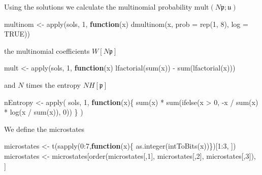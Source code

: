 \documentclass[
]{article}
\newenvironment{Shaded}{\begin{snugshade}}{\end{snugshade}}
\newcommand{\AttributeTok}[1]{\textcolor[rgb]{0.77,0.63,0.00}{#1}}
\newcommand{\ConstantTok}[1]{\textcolor[rgb]{0.00,0.00,0.00}{#1}}
\newcommand{\ControlFlowTok}[1]{\textcolor[rgb]{0.13,0.29,0.53}{\textbf{#1}}}
\newcommand{\DecValTok}[1]{\textcolor[rgb]{0.00,0.00,0.81}{#1}}
\newcommand{\FunctionTok}[1]{\textcolor[rgb]{0.00,0.00,0.00}{#1}}
\newcommand{\NormalTok}[1]{#1}
\newcommand{\OtherTok}[1]{\textcolor[rgb]{0.56,0.35,0.01}{#1}}
\newcommand{\SpecialCharTok}[1]{\textcolor[rgb]{0.00,0.00,0.00}{#1}}
\newcommand{\prob}[1]{\mathfrak{#1}}
\begin{document}
Using the solutions we calculate the multinomial probability
\(\text{mult}(N\prob p;\prob u)\)

\begin{Shaded}
\begin{Highlighting}[]
\NormalTok{multinom }\OtherTok{\textless{}{-}} \FunctionTok{apply}\NormalTok{(sols, }\DecValTok{1}\NormalTok{, }\ControlFlowTok{function}\NormalTok{(x) }\FunctionTok{dmultinom}\NormalTok{(x, }\AttributeTok{prob =} \FunctionTok{rep}\NormalTok{(}\DecValTok{1}\NormalTok{, }\DecValTok{8}\NormalTok{), }\AttributeTok{log =} \ConstantTok{TRUE}\NormalTok{))}
\end{Highlighting}
\end{Shaded}

the multinomial coefficients \(W[N\prob p]\)

\begin{Shaded}
\begin{Highlighting}[]
\NormalTok{mult }\OtherTok{\textless{}{-}} \FunctionTok{apply}\NormalTok{(sols, }\DecValTok{1}\NormalTok{, }\ControlFlowTok{function}\NormalTok{(x) }\FunctionTok{lfactorial}\NormalTok{(}\FunctionTok{sum}\NormalTok{(x)) }\SpecialCharTok{{-}} \FunctionTok{sum}\NormalTok{(}\FunctionTok{lfactorial}\NormalTok{(x)))}
\end{Highlighting}
\end{Shaded}

and \(N\) times the entropy \(N H[\prob p]\)

\begin{Shaded}
\begin{Highlighting}[]
\NormalTok{nEntropy }\OtherTok{\textless{}{-}} \FunctionTok{apply}\NormalTok{(}
\NormalTok{    sols, }\DecValTok{1}\NormalTok{,}
    \ControlFlowTok{function}\NormalTok{(x)\{}
        \FunctionTok{sum}\NormalTok{(x) }\SpecialCharTok{*} \FunctionTok{sum}\NormalTok{(}\FunctionTok{ifelse}\NormalTok{(x }\SpecialCharTok{\textgreater{}} \DecValTok{0}\NormalTok{, }\SpecialCharTok{{-}}\NormalTok{x }\SpecialCharTok{/} \FunctionTok{sum}\NormalTok{(x) }\SpecialCharTok{*} \FunctionTok{log}\NormalTok{(x }\SpecialCharTok{/} \FunctionTok{sum}\NormalTok{(x)), }\DecValTok{0}\NormalTok{))}
\NormalTok{    \}}
\NormalTok{)}
\end{Highlighting}
\end{Shaded}

We define the microstates

\begin{Shaded}
\begin{Highlighting}[]
\NormalTok{microstates }\OtherTok{\textless{}{-}} \FunctionTok{t}\NormalTok{(}\FunctionTok{sapply}\NormalTok{(}\DecValTok{0}\SpecialCharTok{:}\DecValTok{7}\NormalTok{,}\ControlFlowTok{function}\NormalTok{(x)\{ }\FunctionTok{as.integer}\NormalTok{(}\FunctionTok{intToBits}\NormalTok{(x))\})[}\DecValTok{1}\SpecialCharTok{:}\DecValTok{3}\NormalTok{, ])}
\NormalTok{microstates }\OtherTok{\textless{}{-}}\NormalTok{ microstates[}\FunctionTok{order}\NormalTok{(microstates[,}\DecValTok{1}\NormalTok{], microstates[,}\DecValTok{2}\NormalTok{], microstates[,}\DecValTok{3}\NormalTok{]), ]}
\end{Highlighting}
\end{Shaded}
\end{document}
